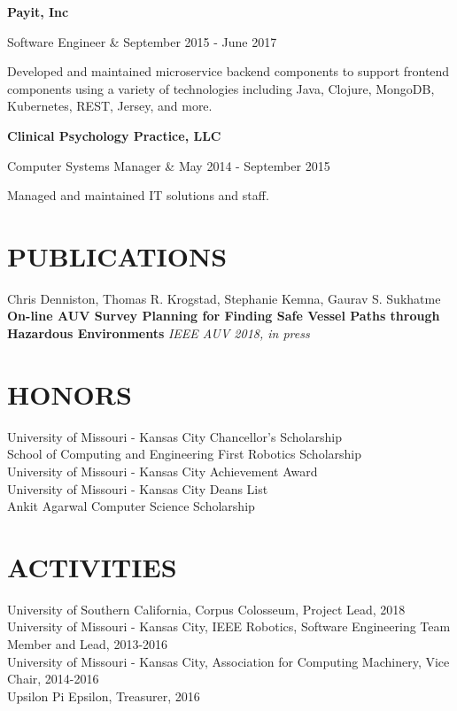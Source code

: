 \documentclass[margin,10pt]{res} %
\begin{document}
\begin{resume}
        {\bf Payit, Inc} \\
            \begin{ncolumn}{2}
            Software Engineer & September 2015 - June 2017
            \end{ncolumn}
            Developed and maintained microservice backend components to support frontend components using a variety of technologies including Java, Clojure, MongoDB, Kubernetes, REST, Jersey, and more.
            
        {\bf Clinical Psychology Practice, LLC} \\
            \begin{ncolumn}{2}
            Computer Systems Manager & May 2014 - September 2015
            \end{ncolumn}
            Managed and maintained IT solutions and staff.

\section{PUBLICATIONS}
Chris Denniston, Thomas R. Krogstad, Stephanie Kemna, Gaurav S. Sukhatme \textbf{On-line AUV Survey Planning for Finding Safe Vessel Paths through
Hazardous Environments} \textit{IEEE AUV 2018, in press} 
 
\section{HONORS}
University of Missouri - Kansas City Chancellor's Scholarship \\
School of Computing and Engineering First Robotics Scholarship \\ 
University of Missouri - Kansas City Achievement Award  \\
University of Missouri - Kansas City Deans List \\
Ankit Agarwal Computer Science Scholarship

 
\section{ACTIVITIES}
University of Southern California, Corpus Colosseum, Project Lead, 2018 \\
University of Missouri - Kansas City, IEEE Robotics, Software Engineering Team Member and Lead, 2013-2016 \\
University of Missouri - Kansas City, Association for Computing Machinery, Vice Chair, 2014-2016\\
Upsilon Pi Epsilon, Treasurer, 2016

\end{resume} 
\end{document}
